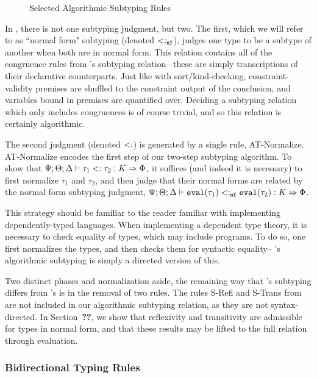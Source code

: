 \begin{figure}

\caption{Selected Algorithmic Subtyping Rules}
\label{fig:bilambdaamor-selected-subty-rules}
\end{figure}

In \bilambdaamor, there is not one subtyping judgment, but two. The first, which we will refer to as ``normal form" subtyping (denoted $<:_{\texttt{nf}}$),  judges one type to be a subtype of another when both are in normal form. This relation contains all of the congruence rules from \dlambdaamor's subtyping relation-- these are simply transcriptions of their declarative counterparts. Just like with sort/kind-checking, constraint-validity premises are shuffled to the constraint output of the conclusion, and variables bound in premises are quantified over. Deciding a subtyping relation which only includes congruences is of course trivial, and so this relation is certainly algorithmic.

The second judgment (denoted $<:$) is generated by a single rule, AT-Normalize. AT-Normalize encodes the first step of our two-step subtyping algorithm.
To show that $\Psi ; \Theta ; \Delta \vdash \tau_1 <: \tau_2 : K \Rightarrow \Phi$, it suffices (and indeed it is necessary) to first normalize $\tau_1$ and $\tau_2$, and then judge that their normal forms are related by the normal form subtyping judgment, $\Psi ; \Theta ; \Delta \vdash \texttt{eval}(\tau_1) <:_{\texttt{nf}} \texttt{eval}(\tau_2) : K \Rightarrow \Phi$.
 
This strategy should be familiar to the reader familiar with implementing dependently-typed languages. When implementing a dependent type theory, it is necessary to check equality of types, which may include programs. To do so, one first normalizes the types, and then checks them for syntactic equality-- \bilambdaamor's algorithmic subtyping is simply a directed version of this.

Two distinct phases and normalization aside, the remaining way that \bilambdaamor's subtyping differs from \dlambdaamor's is in the removal of two rules. The rules S-Refl and S-Trans from \dlambdaamor are not included in our algorithmic subtyping relation, as they are not syntax-directed. In Section~\textbf{??}, we show that reflexivity and transitivity are admissible for types in normal form, and that these results may be lifted to the full relation through evaluation.


\subsubsection{Bidirectional Typing Rules}

